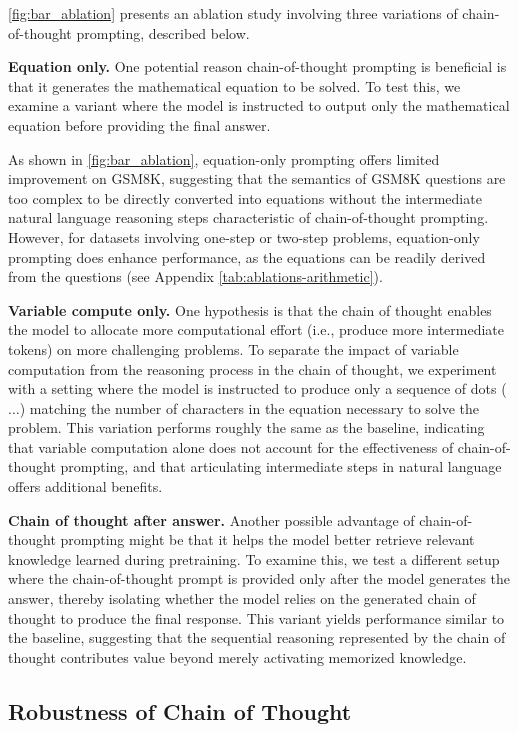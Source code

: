 \cref{fig:bar_ablation} presents an ablation study involving three variations of chain-of-thought prompting, described below.

\textbf{Equation only.} One potential reason chain-of-thought prompting is beneficial is that it generates the mathematical equation to be solved. To test this, we examine a variant where the model is instructed to output only the mathematical equation before providing the final answer. 

As shown in \cref{fig:bar_ablation}, equation-only prompting offers limited improvement on GSM8K, suggesting that the semantics of GSM8K questions are too complex to be directly converted into equations without the intermediate natural language reasoning steps characteristic of chain-of-thought prompting. However, for datasets involving one-step or two-step problems, equation-only prompting does enhance performance, as the equations can be readily derived from the questions (see Appendix \cref{tab:ablations-arithmetic}).


\textbf{Variable compute only.} One hypothesis is that the chain of thought enables the model to allocate more computational effort (i.e., produce more intermediate tokens) on more challenging problems. To separate the impact of variable computation from the reasoning process in the chain of thought, we experiment with a setting where the model is instructed to produce only a sequence of dots ($\ldots$) matching the number of characters in the equation necessary to solve the problem. This variation performs roughly the same as the baseline, indicating that variable computation alone does not account for the effectiveness of chain-of-thought prompting, and that articulating intermediate steps in natural language offers additional benefits.

\textbf{Chain of thought after answer.} Another possible advantage of chain-of-thought prompting might be that it helps the model better retrieve relevant knowledge learned during pretraining. To examine this, we test a different setup where the chain-of-thought prompt is provided only after the model generates the answer, thereby isolating whether the model relies on the generated chain of thought to produce the final response. This variant yields performance similar to the baseline, suggesting that the sequential reasoning represented by the chain of thought contributes value beyond merely activating memorized knowledge.


\subsection{Robustness of Chain of Thought}\label{subsec:robustness}

